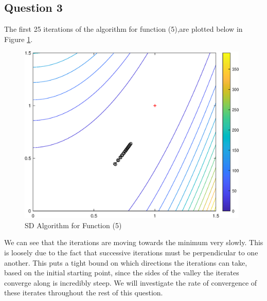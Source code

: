 \documentclass[10pt,a4paper,notitlepage]{article}
\begin{document}
\subsection*{\centering Question 3}
The first 25 iterations of the algorithm for function (5),are plotted below in Figure \ref{fg:4}.
\begin{figure}[H]
\centering
\includegraphics[width=11cm]{Image_4}
\caption{SD Algorithm for Function (5)}\label{fg:4}
\end{figure}
We can see that the iterations are moving towards the minimum very slowly. This is loosely due to the fact that successive iterations must be perpendicular to one another. This puts a tight bound on which directions the iterations can take, based on the initial starting point, since the sides of the valley the iterates converge along is incredibly steep. We will investigate the rate of convergence of these iterates throughout the rest of this question.
\end{document}
